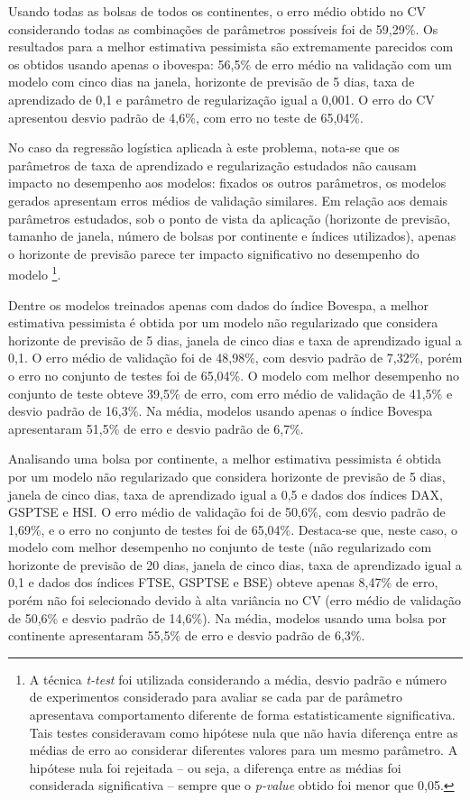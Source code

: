 \documentclass[12pt,a4paper,utf8]{ppgsi}
\begin{document}
        Usando todas as bolsas de todos os continentes, o erro médio obtido no CV considerando todas as combinações de parâmetros possíveis foi de 59,29\%. Os resultados para a melhor estimativa pessimista são extremamente parecidos com os obtidos usando apenas o ibovespa: 56,5\% de erro médio na validação com um modelo com cinco dias na janela, horizonte de previsão de 5 dias, taxa de aprendizado de 0,1 e parâmetro de regularização igual a 0,001. O erro do CV apresentou desvio padrão de 4,6\%, com erro no teste de 65,04\%.

        No caso da regressão logística aplicada à este problema, nota-se que os parâmetros de taxa de aprendizado e regularização estudados não causam impacto no desempenho aos modelos: fixados os outros parâmetros, os modelos gerados apresentam erros médios de validação similares. Em relação aos demais parâmetros estudados, sob o ponto de vista da aplicação (horizonte de previsão, tamanho de janela, número de bolsas por continente e índices utilizados), apenas o horizonte de previsão parece ter impacto significativo no desempenho do modelo \footnote{A técnica \textit{t-test} foi utilizada considerando a média, desvio padrão e número de experimentos considerado para avaliar se cada par de parâmetro apresentava comportamento diferente de forma estatisticamente significativa. Tais testes consideravam como hipótese nula que não havia diferença entre as médias de erro ao considerar diferentes valores para um mesmo parâmetro. A hipótese nula foi rejeitada -- ou seja, a diferença entre as médias foi considerada significativa -- sempre que o \textit{p-value} obtido foi menor que 0,05.}.

        Dentre os modelos treinados apenas com dados do índice Bovespa, a melhor estimativa pessimista é obtida por um modelo não regularizado que considera horizonte de previsão de 5 dias, janela de cinco dias e taxa de aprendizado igual a 0,1. O erro médio de validação foi de 48,98\%, com desvio padrão de 7,32\%, porém o erro no conjunto de testes foi de 65,04\%. O modelo com melhor desempenho no conjunto de teste obteve 39,5\% de erro, com erro médio de validação de 41,5\% e desvio padrão de 16,3\%. Na média, modelos usando apenas o índice Bovespa apresentaram 51,5\% de erro e desvio padrão de 6,7\%.

        Analisando uma bolsa por continente, a melhor estimativa pessimista é obtida por um modelo não regularizado que considera horizonte de previsão de 5 dias, janela de cinco dias, taxa de aprendizado igual a 0,5 e dados dos índices DAX, GSPTSE e HSI. O erro médio de validação foi de 50,6\%, com desvio padrão de 1,69\%, e o erro no conjunto de testes foi de 65,04\%. Destaca-se que, neste caso, o modelo com melhor desempenho no conjunto de teste (não regularizado com horizonte de previsão de 20 dias, janela de cinco dias, taxa de aprendizado igual a 0,1 e dados dos índices FTSE, GSPTSE e BSE) obteve apenas 8,47\% de erro, porém não foi selecionado devido à alta variância no CV (erro médio de validação de 50,6\% e desvio padrão de 14,6\%). Na média, modelos usando uma bolsa por continente apresentaram 55,5\% de erro e desvio padrão de 6,3\%.
\end{document}
